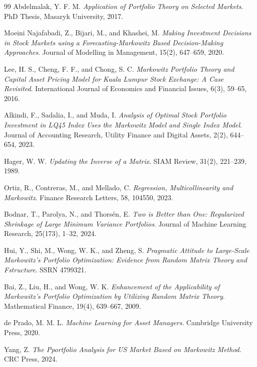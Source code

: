 \documentclass[preprint,12pt]{elsarticle}
\theoremstyle{plain}
\theoremstyle{definition}
\begin{document}
\begin{thebibliography}{99}
Abdelmalak, Y. F. M.  
\textit{Application of Portfolio Theory on Selected Markets}.  
PhD Thesis, Masaryk University, 2017.

Moeini Najafabadi, Z., Bijari, M., and Khashei, M.  
\textit{Making Investment Decisions in Stock Markets using a Forecasting-Markowitz Based Decision-Making Approaches}.  
Journal of Modelling in Management, 15(2), 647--659, 2020.

Lee, H. S., Cheng, F. F., and Chong, S. C.  
\textit{Markowitz Portfolio Theory and Capital Asset Pricing Model for Kuala Lumpur Stock Exchange: A Case Revisited}.  
International Journal of Economics and Financial Issues, 6(3), 59--65, 2016.

Alkindi, F., Sadalia, I., and Muda, I.  
\textit{Analysis of Optimal Stock Portfolio Investment in LQ45 Index Uses the Markowitz Model and Single Index Model}.  
Journal of Accounting Research, Utility Finance and Digital Assets, 2(2), 644--654, 2023.

Hager, W. W.  
\textit{Updating the Inverse of a Matrix}.  
SIAM Review, 31(2), 221--239, 1989.

Ortiz, R., Contreras, M., and Mellado, C.  
\textit{Regression, Multicollinearity and Markowitz}.  
Finance Research Letters, 58, 104550, 2023.

Bodnar, T., Parolya, N., and Thorsén, E.  
\textit{Two is Better than One: Regularized Shrinkage of Large Minimum Variance Portfolios}.  
Journal of Machine Learning Research, 25(173), 1--32, 2024.

Hui, Y., Shi, M., Wong, W. K., and Zheng, S.  
\textit{Pragmatic Attitude to Large-Scale Markowitz's Portfolio Optimization: Evidence from Random Matrix Theory and Fstructure}.  
SSRN 4799321.

Bai, Z., Liu, H., and Wong, W. K.  
\textit{Enhancement of the Applicability of Markowitz's Portfolio Optimization by Utilizing Random Matrix Theory}.  
Mathematical Finance, 19(4), 639--667, 2009.

de Prado, M. M. L.  
\textit{Machine Learning for Asset Managers}.  
Cambridge University Press, 2020.



Yang, Z.  
\textit{The Pportfolio Analysis for US Market Based on Markowitz Method}.  
CRC Press, 2024.


\end{thebibliography}
\end{document}
